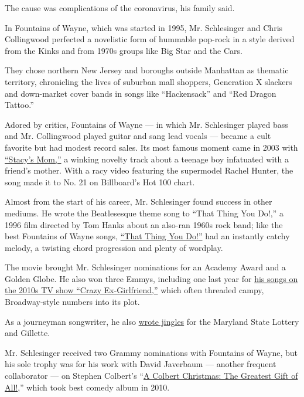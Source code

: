 The cause was complications of the coronavirus, his family said.

In Fountains of Wayne, which was started in 1995, Mr. Schlesinger and
Chris Collingwood perfected a novelistic form of hummable pop-rock in a
style derived from the Kinks and from 1970s groups like Big Star and the
Cars.

They chose northern New Jersey and boroughs outside Manhattan as
thematic territory, chronicling the lives of suburban mall shoppers,
Generation X slackers and down-market cover bands in songs like
``Hackensack'' and ``Red Dragon Tattoo.''

Adored by critics, Fountains of Wayne --- in which Mr. Schlesinger
played bass and Mr. Collingwood played guitar and sang lead vocals ---
became a cult favorite but had modest record sales. Its most famous
moment came in 2003 with
\href{https://www.youtube.com/watch?v=dZLfasMPOU4}{``Stacy's Mom,''} a
winking novelty track about a teenage boy infatuated with a friend's
mother. With a racy video featuring the supermodel Rachel Hunter, the
song made it to No. 21 on Billboard's Hot 100 chart.

Almost from the start of his career, Mr. Schlesinger found success in
other mediums. He wrote the Beatlesesque theme song to ``That Thing You
Do!,'' a 1996 film directed by Tom Hanks about an also-ran 1960s rock
band; like the best Fountains of Wayne songs,
\href{https://www.youtube.com/watch?v=Dsi-eF6-uOY}{``That Thing You
Do!''} had an instantly catchy melody, a twisting chord progression and
plenty of wordplay.

The movie brought Mr. Schlesinger nominations for an Academy Award and a
Golden Globe. He also won three Emmys, including one last year for
\href{https://www.nytimes.com/2018/10/10/arts/television/crazy-ex-girlfriend-best-songs.html}{his
songs on the 2010s TV show ``Crazy Ex-Girlfriend,''} which often
threaded campy, Broadway-style numbers into its plot.

As a journeyman songwriter, he also
\href{https://ew.com/article/2007/04/20/adam-schlesingers-musical-resume/}{wrote
jingles} for the Maryland State Lottery and Gillette.

Mr. Schlesinger received two Grammy nominations with Fountains of Wayne,
but his sole trophy was for his work with David Javerbaum --- another
frequent collaborator --- on Stephen Colbert's
``\href{https://www.nytimes.com/2008/11/21/arts/television/21colb.html}{A
Colbert Christmas: The Greatest Gift of All!},'' which took best comedy
album in 2010.

